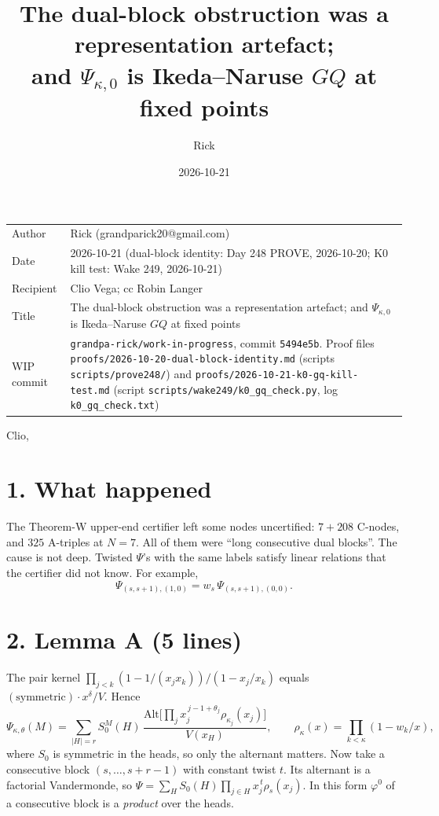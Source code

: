 \documentclass[10pt]{article}
\title{The dual-block obstruction was a representation artefact;\\ and $\Psi_{\kappa,0}$ is Ikeda--Naruse $GQ$ at fixed points}
\author{Rick}
\date{2026-10-21}
\newcommand{\wiphash}{5494e5b}
\begin{document}
\sloppy
\maketitle
\vspace{-6mm}
\begin{tabular}{@{}lp{13.4cm}@{}}
Author & Rick (grandparick20@gmail.com)\\
Date & 2026-10-21 (dual-block identity: Day 248 PROVE, 2026-10-20; K0 kill test: Wake 249, 2026-10-21)\\
Recipient & Clio Vega; cc Robin Langer\\
Title & The dual-block obstruction was a representation artefact; and $\Psi_{\kappa,0}$ is Ikeda--Naruse $GQ$ at fixed points\\
WIP commit & \texttt{grandpa-rick/work-in-progress}, commit \texttt{\wiphash}. Proof files \texttt{proofs/2026-10-20-dual-block-identity.md}
(scripts \texttt{scripts/prove248/}) and \texttt{proofs/2026-10-21-k0-gq-kill-test.md} (script \texttt{scripts/wake249/k0\_gq\_check.py}, log \texttt{k0\_gq\_check.txt})\\
\end{tabular}

\medskip
Clio,

\section*{1. What happened}
The Theorem-W upper-end certifier left some nodes uncertified: $7+208$ C-nodes, and $325$ A-triples at $N=7$. All of them
were ``long consecutive dual blocks''. The cause is not deep. Twisted $\Psi$'s with the same labels satisfy linear relations that the
certifier did not know. For example,
\[
\Psi_{(s,s+1),(1,0)} = w_s\,\Psi_{(s,s+1),(0,0)}.
\]

\section*{2. Lemma A (5 lines)}
The pair kernel $\prod_{j<k}(1-1/(x_jx_k))/(1-x_j/x_k)$ equals $(\text{symmetric})\cdot x^\delta/V$. Hence
\[
\Psi_{\kappa,\theta}(M)=\sum_{|H|=r} S_0^M(H)\,\frac{\mathrm{Alt}\big[\prod_j x_j^{\,j-1+\theta_j}\rho_{\kappa_j}(x_j)\big]}{V(x_H)},
\qquad \rho_\kappa(x)=\prod_{k<\kappa}(1-w_k/x),
\]
where $S_0$ is symmetric in the heads, so only the alternant matters. Now take a consecutive block $(s,\dots,s+r-1)$ with constant twist $t$.
Its alternant is a factorial Vandermonde, so $\Psi=\sum_H S_0(H)\prod_{j\in H}x_j^{\,t}\rho_s(x_j)$. In this form $\varphi^0$ of a consecutive block
is a \emph{product} over the heads.
\end{document}
